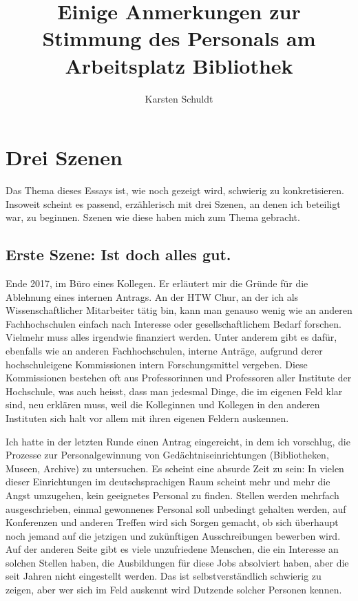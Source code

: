 \documentclass[a4paper,
fontsize=11pt,
oneside,
numbers=noperiodatend,
parskip=half-,
bibliography=totoc,
final
]{scrartcl}
\title{\LARGE{Einige Anmerkungen zur Stimmung des Personals am Arbeitsplatz Bibliothek}} %
\author{Karsten Schuldt} %
\date{}
\begin{document}
\maketitle
\thispagestyle{fancyplain} 


\hypertarget{drei-szenen}{%
\section*{Drei Szenen}\label{drei-szenen}}

Das Thema dieses Essays ist, wie noch gezeigt wird, schwierig zu
konkretisieren. Insoweit scheint es passend, erzählerisch mit drei
Szenen, an denen ich beteiligt war, zu beginnen. Szenen wie diese haben
mich zum Thema gebracht.

\hypertarget{erste-szene-ist-doch-alles-gut.}{%
\subsection*{Erste Szene: Ist doch alles
gut.}\label{erste-szene-ist-doch-alles-gut.}}

Ende 2017, im Büro eines Kollegen. Er erläutert mir die Gründe für die
Ablehnung eines internen Antrags. An der HTW Chur, an der ich als
Wissenschaftlicher Mitarbeiter tätig bin, kann man genauso wenig wie an
anderen Fachhochschulen einfach nach Interesse oder gesellschaftlichem
Bedarf forschen. Vielmehr muss alles irgendwie finanziert werden. Unter
anderem gibt es dafür, ebenfalls wie an anderen Fachhochschulen, interne
Anträge, aufgrund derer hochschuleigene Kommissionen intern
Forschungsmittel vergeben. Diese Kommissionen bestehen oft aus
Professorinnen und Professoren aller Institute der Hochschule, was auch
heisst, dass man jedesmal Dinge, die im eigenen Feld klar sind, neu
erklären muss, weil die Kolleginnen und Kollegen in den anderen
Instituten sich halt vor allem mit ihren eigenen Feldern auskennen.

Ich hatte in der letzten Runde einen Antrag eingereicht, in dem ich
vorschlug, die Prozesse zur Personalgewinnung von
Gedächtniseinrichtungen (Bibliotheken, Museen, Archive) zu untersuchen.
Es scheint eine absurde Zeit zu sein: In vielen dieser Einrichtungen im
deutschsprachigen Raum scheint mehr und mehr die Angst umzugehen, kein
geeignetes Personal zu finden. Stellen werden mehrfach ausgeschrieben,
einmal gewonnenes Personal soll unbedingt gehalten werden, auf
Konferenzen und anderen Treffen wird sich Sorgen gemacht, ob sich
überhaupt noch jemand auf die jetzigen und zukünftigen Ausschreibungen
bewerben wird. Auf der anderen Seite gibt es viele unzufriedene
Menschen, die ein Interesse an solchen Stellen haben, die Ausbildungen
für diese Jobs absolviert haben, aber die seit Jahren nicht eingestellt
werden. Das ist selbstverständlich schwierig zu zeigen, aber wer sich im
Feld auskennt wird Dutzende solcher Personen kennen.
\end{document}
